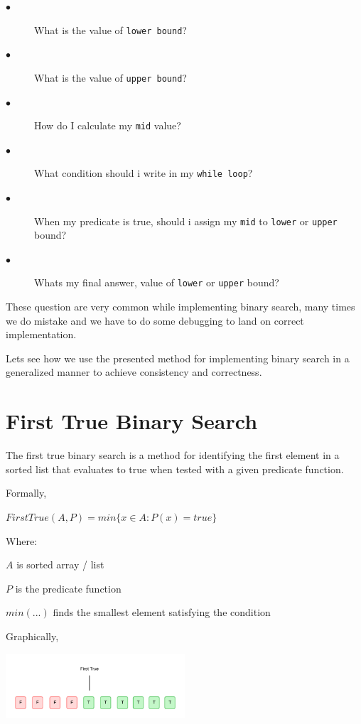\documentclass[10pt,twocolumn]{article}
\begin{document}
	\begin{description}
		\item[$\bullet$]  What is the value of \texttt{lower bound}?
		\item[$\bullet$]  What is the value of \texttt{upper bound}?
		\item[$\bullet$]  How do I calculate my \texttt{mid} value?
		\item[$\bullet$]  What condition should i write in my \texttt{while loop}?
		\item[$\bullet$]  When my predicate is true, should i assign my \texttt{mid} to \texttt{lower} or \texttt{upper} bound?
		\item[$\bullet$]  Whats my final answer, value of \texttt{lower} or \texttt{upper} bound?
	\end{description}
	
	These question are very common while implementing binary search, many times we do mistake and we have to do some debugging to land on correct implementation.
	
	Lets see how we use the presented method for implementing binary search in a generalized manner to achieve consistency and correctness.
	
	\section{First True Binary Search}
	
	The first true binary search is a method for identifying the first element in a sorted list that evaluates to true when tested with a given predicate function.	
	
	\vspace{10pt}
	
	Formally, 
	
	\vspace*{5pt}
	$FirstTrue(A, P) = min\{x \in A: P(x) = true\}$
	\vspace*{5pt}
	
	Where:
	
			\quad$A$ is sorted array / list
		
			\quad$P$ is the predicate function
		
			\quad$min(...)$ finds the smallest element satisfying the condition
			
			
		
	\vspace{10pt}
	
	Graphically,
	
	\includegraphics[width=0.5\textwidth]{firsttrue.png}
	
\end{document}
